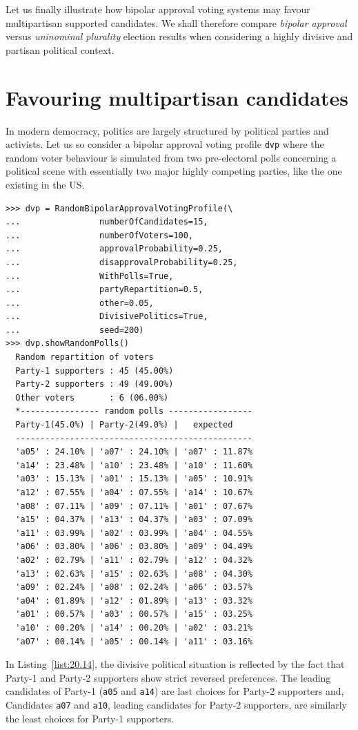 Let us finally illustrate how bipolar approval voting systems may favour multipartisan supported candidates. We shall therefore compare \emph{bipolar approval} versus \emph{uninominal plurality} election results when considering a highly divisive and partisan political context.
 
\section{Favouring multipartisan candidates}
\label{sec:20.5}

In modern democracy, politics  are largely structured by political parties and activists. Let us so consider a bipolar approval voting profile \texttt{dvp} where the random voter behaviour is simulated from two pre-electoral polls concerning a political scene with essentially two major highly competing parties, like the one existing in the US.
\begin{lstlisting}[caption={A random bipolar approval voting profile in a divisive political context},label=list:20.14]
>>> dvp = RandomBipolarApprovalVotingProfile(\
...                numberOfCandidates=15,
...                numberOfVoters=100,
...                approvalProbability=0.25,
...                disapprovalProbability=0.25,
...                WithPolls=True,
...                partyRepartition=0.5,
...                other=0.05,
...                DivisivePolitics=True,
...                seed=200)
>>> dvp.showRandomPolls()
  Random repartition of voters
  Party-1 supporters : 45 (45.00%)
  Party-2 supporters : 49 (49.00%)
  Other voters       : 6 (06.00%)
  *---------------- random polls -----------------
  Party-1(45.0%) | Party-2(49.0%) |   expected  
  ------------------------------------------------
  'a05' : 24.10% | 'a07' : 24.10% | 'a07' : 11.87%
  'a14' : 23.48% | 'a10' : 23.48% | 'a10' : 11.60%
  'a03' : 15.13% | 'a01' : 15.13% | 'a05' : 10.91%
  'a12' : 07.55% | 'a04' : 07.55% | 'a14' : 10.67%
  'a08' : 07.11% | 'a09' : 07.11% | 'a01' : 07.67%
  'a15' : 04.37% | 'a13' : 04.37% | 'a03' : 07.09%
  'a11' : 03.99% | 'a02' : 03.99% | 'a04' : 04.55%
  'a06' : 03.80% | 'a06' : 03.80% | 'a09' : 04.49%
  'a02' : 02.79% | 'a11' : 02.79% | 'a12' : 04.32%
  'a13' : 02.63% | 'a15' : 02.63% | 'a08' : 04.30%
  'a09' : 02.24% | 'a08' : 02.24% | 'a06' : 03.57%
  'a04' : 01.89% | 'a12' : 01.89% | 'a13' : 03.32%
  'a01' : 00.57% | 'a03' : 00.57% | 'a15' : 03.25%
  'a10' : 00.20% | 'a14' : 00.20% | 'a02' : 03.21%
  'a07' : 00.14% | 'a05' : 00.14% | 'a11' : 03.16%
\end{lstlisting}   
In Listing~\vref{list:20.14}, the divisive political situation is reflected by the fact that Party-1 and Party-2 supporters show strict reversed preferences. The leading candidates of Party-1 (\texttt{a05} and \texttt{a14}) are last choices for Party-2 supporters and, Candidates \texttt{a07} and \texttt{a10}, leading candidates for Party-2 supporters, are similarly the least choices for Party-1 supporters.


